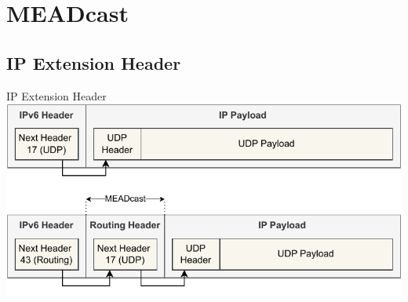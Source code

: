 \documentclass[compress,fleqn,utf8,aspectratio=169,t]{beamer}
\begin{document}

\section{MEADcast}
\subsection{IP Extension Header} %
\label{sub:IP Extension Header}
\begin{frame}[c]{IP Extension Header}
\centering
\includegraphics[width=.6\textwidth]{exthdr.pdf}
\end{frame}
\end{document}
